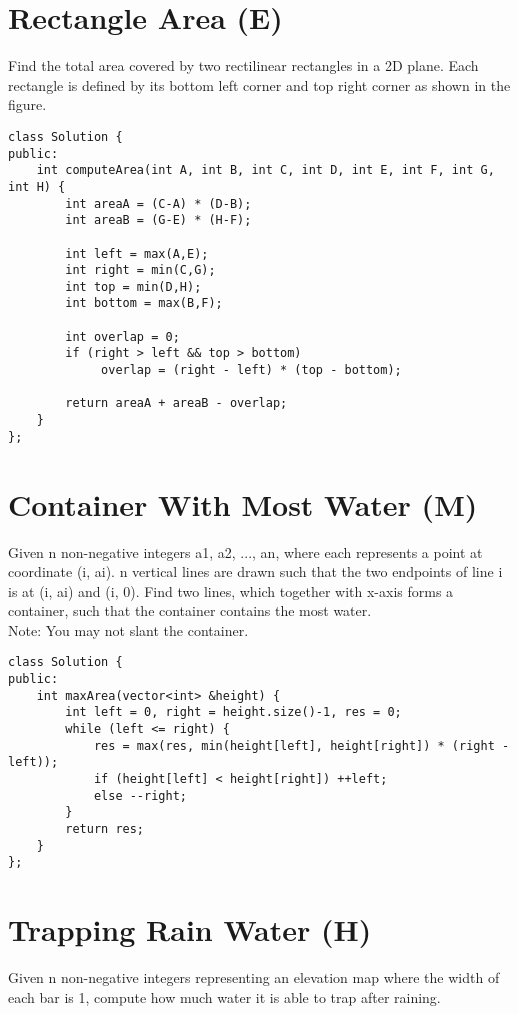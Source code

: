 \section{Rectangle Area (E)}
Find the total area covered by two rectilinear rectangles in a 2D plane. Each rectangle is defined by its bottom left corner and top right corner as shown in the figure. \\

\begin{lstlisting}
class Solution {
public:
    int computeArea(int A, int B, int C, int D, int E, int F, int G, int H) {
        int areaA = (C-A) * (D-B);
        int areaB = (G-E) * (H-F);
        
        int left = max(A,E);
        int right = min(C,G);
        int top = min(D,H);
        int bottom = max(B,F);
        
        int overlap = 0;
        if (right > left && top > bottom)
             overlap = (right - left) * (top - bottom);
             
        return areaA + areaB - overlap;
    }
};
\end{lstlisting}


\section{Container With Most Water (M)}
Given n non-negative integers a1, a2, ..., an, where each represents a point at coordinate (i, ai). n vertical lines are drawn such that the two endpoints of line i is at (i, ai) and (i, 0). Find two lines, which together with x-axis forms a container, such that the container contains the most water.\\

Note: You may not slant the container. \\

\begin{lstlisting}
class Solution {
public:
    int maxArea(vector<int> &height) {
        int left = 0, right = height.size()-1, res = 0;
        while (left <= right) {
            res = max(res, min(height[left], height[right]) * (right - left));
            if (height[left] < height[right]) ++left;
            else --right;
        }
        return res;
    }
};
\end{lstlisting}


\section {Trapping Rain Water (H)}
Given n non-negative integers representing an elevation map where the width of each bar is 1, compute how much water it is able to trap after raining.\\

